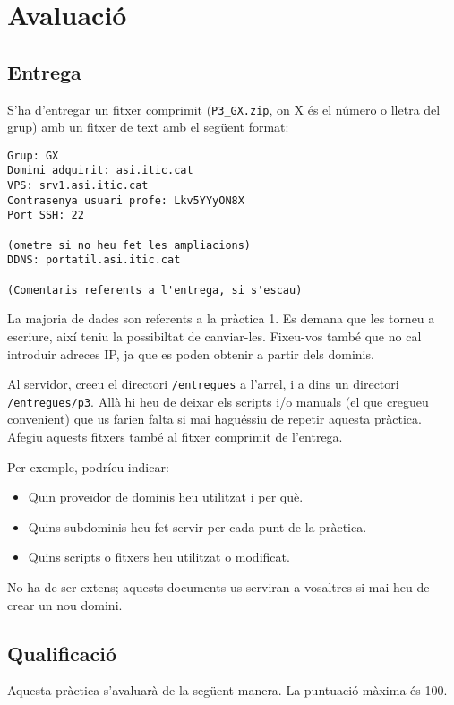 \documentclass{practicaitic}
\begin{document}
\section{Avaluació}
\subsection{Entrega}
\label{sec:entrega}

S'ha d'entregar un fitxer comprimit (\texttt{P3\_GX.zip}, on X és el número o 
lletra del grup) amb un fitxer de text amb el següent format:

\begin{verbatim}
Grup: GX
Domini adquirit: asi.itic.cat
VPS: srv1.asi.itic.cat
Contrasenya usuari profe: Lkv5YYyON8X
Port SSH: 22

(ometre si no heu fet les ampliacions)
DDNS: portatil.asi.itic.cat

(Comentaris referents a l'entrega, si s'escau)
\end{verbatim}

La majoria de dades son referents a la pràctica 1. Es demana
que les torneu a escriure, així teniu la possibiltat de canviar-les.
Fixeu-vos també que no cal introduir adreces IP, ja que es poden
obtenir a partir dels dominis.

Al servidor, creeu el directori \texttt{/entregues} a l'arrel, i a dins un
directori \texttt{/entregues/p3}. Allà hi heu de deixar els scripts i/o manuals
(el que cregueu convenient) que us farien falta si mai haguéssiu de repetir
aquesta pràctica. Afegiu aquests fitxers també al fitxer comprimit de l'entrega.

Per exemple, podríeu indicar:
\begin{itemize}
  \item Quin proveïdor de dominis heu utilitzat i per què.
  \item Quins subdominis heu fet servir per cada punt de la pràctica.
  \item Quins scripts o fitxers heu utilitzat o modificat.
\end{itemize}

No ha de ser extens; aquests documents us serviran a vosaltres si mai heu de
crear un nou domini.

\subsection{Qualificació}

Aquesta pràctica s'avaluarà de la següent manera. La puntuació màxima és 100.
\end{document}

